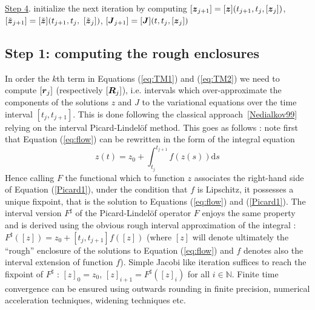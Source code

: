 \documentclass{sig-alternate-05-2015} %
\newcommand\ForAuthors[1]%
 {\par\smallskip                     %
  \begin{center}%
   \fbox%
   {\parbox{0.9\linewidth}%
    {\raggedright\sc--- #1}%
   }%
  \end{center}%
  \par\smallskip                     %
 }
\def\N{{\mathbb N}}
\def\intvl#1{\mbox{$[ #1 ]$}}
\begin{document}
{\begin{center}
{{\underline{Step 4}. initialize the next iteration by computing $[{\z}_{j+1}]=[\z](t_{j+1},t_j,[{\z}_j])$, $[\tilde{\z}_{j+1}]=[\tilde{\z}](t_{j+1},t_j,$ $[\tilde{\z}_j])$, $[\J_{j+1}] = [\J](t,t_j,[{\z}_j]) $\\
 }%
   }%
  \end{center}%
  \par\smallskip                     %
 }        


\subsection{Step 1: computing the rough enclosures}
\label{roughenc}

In order the $k$th term in Equations (\ref{eq:TM1}) and (\ref{eq:TM2}) we need
to compute $\intvl{\r_j}$ (respectively $\intvl{\bfm{R}_j}$), i.e. intervals which over-approximate 
the components of the solutions $z$ and $J$ to the variational equations over the
time interval $[t_j,t_{j+1}]$. This is done following the classical approach~\ref{Nedialkov99} relying on the  interval
Picard-Lindel\"of method. This goes as follows : note first that Equation 
(\ref{eq:flow}) can be rewritten in the form of the integral equation
\begin{equation}
z(t) = z_0+\int_{t_j}^{t_{j+1}} \! f(z(s)) \mathrm{d}s
\label{Picard1}
\end{equation}
Hence calling $F$ the functional which to function $z$ associates the right-hand
side of Equation (\ref{Picard1}), under the condition that $f$ is Lipschitz, it 
possesses a unique fixpoint, that is the solution to Equations (\ref{eq:flow}) and
(\ref{Picard1}). The interval version ${F}^{\sharp}$ of the Picard-Lindel\"of operator $F$ 
enjoys the same property and is derived using the obvious rough interval approximation
of the integral : $F^{\sharp}(\intvl{z})=z_0+[t_j,t_{j+1}]f(\intvl{z})$ (where
$\intvl{z}$ will denote ultimately the ``rough'' enclosure of the solutions to
Equation (\ref{eq:flow}) and $f$ denotes also the interval extension of function $f$). 
Simple Jacobi like iteration suffices to reach the fixpoint of $F^{\sharp}$ : 
$\intvl{z}_0=z_0$, $\intvl{z}_{i+1}=F^{\sharp}(\intvl{z}_i)$ for all $i \in \N$. 
Finite time convergence can be ensured using outwards rounding in finite precision,
numerical acceleration techniques, widening techniques etc. 

\end{document}

